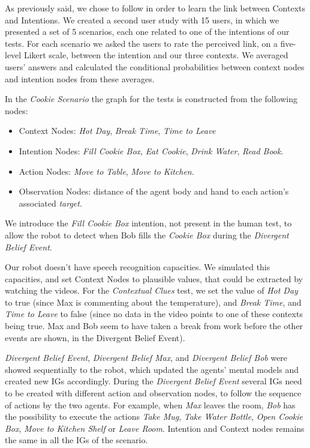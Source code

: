 As previously said, we chose to follow \cite{Liu2014} in order to learn the link between Contexts and Intentions. We created a second user study with 15 users, in which we presented a set of 5 scenarios, each one related to one of the intentions of our tests. For each scenario we asked the users to rate the perceived link, on a five-level Likert scale, between the intention and our three contexts. We averaged users' answers and calculated the conditional probabilities between context nodes and intention nodes from these averages.


In the \textit{Cookie Scenario} the graph for the tests is constructed from the following nodes:
\begin{itemize}
\item Context Nodes: \textit{Hot Day}, \textit{Break Time}, \textit{Time to Leave}
\item Intention Nodes: \textit{Fill Cookie Box}, \textit{Eat Cookie}, \textit{Drink Water}, \textit{Read Book}.
\item Action Nodes: \textit{Move to Table}, \textit{Move to Kitchen}.
\item Observation Nodes: distance of the agent body and hand to each action's associated \textit{target}.
\end{itemize}

We introduce the \textit{Fill Cookie Box} intention, not present in the human test, to allow the robot to detect when Bob fills the \textit{Cookie Box} during the \textit{Divergent Belief Event}.

Our robot doesn't have speech recognition capacities. We simulated this capacities, and set Context Nodes to plausible values, that could be extracted by watching the videos. For the \textit{Contextual Clues} test, we set the value of \textit{Hot Day} to true (since Max is commenting about the temperature), and \textit{Break Time}, and \textit{Time to Leave} to false (since no data in the video points to one of these contexts being true. Max and Bob seem to have taken a break from work before the other events are shown, in the Divergent Belief Event).

\textit{Divergent Belief Event}, \textit{Divergent Belief Max}, and \textit{Divergent Belief Bob} were showed sequentially to the robot, which updated the agents' mental models and created new IGs accordingly. During the \textit{Divergent Belief Event} several IGs need to be created with different action and observation nodes, to follow the sequence of actions by the two agents. For example, when \textit{Max} leaves the room, \textit{Bob} has the possibility to execute the actions \textit{Take Mug}, \textit{Take Water Bottle}, \textit{Open Cookie Box}, \textit{Move to Kitchen Shelf} or \textit{Leave Room}. Intention and Context nodes remains the same in all the IGs of the scenario.


